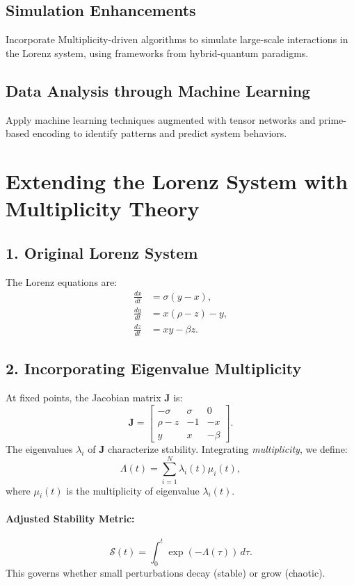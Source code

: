\documentclass{article}
\theoremstyle{plain}
\begin{document}
\subsection*{Simulation Enhancements}
Incorporate Multiplicity-driven algorithms to simulate large-scale interactions in the Lorenz system, using frameworks from hybrid-quantum paradigms.

\subsection*{Data Analysis through Machine Learning}
Apply machine learning techniques augmented with tensor networks and prime-based encoding to identify patterns and predict system behaviors.
\section*{Extending the Lorenz System with Multiplicity Theory}

\subsection*{1. Original Lorenz System}
The Lorenz equations are:
\begin{align}
\frac{dx}{dt} &= \sigma (y - x), \\
\frac{dy}{dt} &= x(\rho - z) - y, \\
\frac{dz}{dt} &= xy - \beta z.
\end{align}

\subsection*{2. Incorporating Eigenvalue Multiplicity}
At fixed points, the Jacobian matrix $\mathbf{J}$ is:
\[
\mathbf{J} = 
\begin{bmatrix}
-\sigma & \sigma & 0 \\
\rho - z & -1 & -x \\
y & x & -\beta
\end{bmatrix}.
\]
The eigenvalues $\lambda_i$ of $\mathbf{J}$ characterize stability. Integrating \textit{multiplicity}, we define:
\[
\Lambda(t) = \sum_{i=1}^N \lambda_i(t) \mu_i(t),
\]
where $\mu_i(t)$ is the multiplicity of eigenvalue $\lambda_i(t)$.

\paragraph{Adjusted Stability Metric:}
\[
\mathcal{S}(t) = \int_0^t \exp\left(-\Lambda(\tau)\right) \, d\tau.
\]
This governs whether small perturbations decay (stable) or grow (chaotic).
\end{document}
